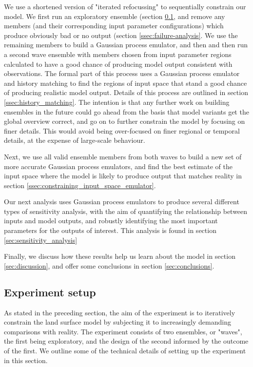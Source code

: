 \documentclass[gmd, manuscript]{copernicus}
\begin{document}
We use a shortened version of "iterated refocussing" to sequentially constrain our model.  We first run an exploratory ensemble (section \ref{ssec:experiment_setup}, and remove any members (and their corresponding input parameter configurations) which produce obviously bad or no output (section \ref{ssec:failure-analysis}. We use the remaining members to build a Gaussian process emulator, and then and then run a second wave ensemble with members chosen from input parameter regions calculated to have a good chance of producing model output consistent with observations. The formal part of this process uses a Gaussian process emulator and history matching to find the regions of input space that stand a good chance of producing realistic model output. Details of this process are outlined in section \ref{ssec:history_matching}. The intention is that any further work on building ensembles in the future could go ahead from the basis that model variants get the global overview correct, and go on to further constrain the model by focusing on finer details. This would avoid being over-focused on finer regional or temporal details, at the expense of large-scale behaviour.

Next, we use all valid ensemble members from both waves to build a new set of more accurate Gaussian process emulators, and find the best estimate of the input space where the model is likely to produce output that matches reality in section \ref{ssec:constraining_input_space_emulator}.

Our next analysis uses Gaussian process emulators to produce several different types of sensitivity analysis, with the aim of quantifying the relationship between inputs and model outputs, and robustly identifying the most important parameters for the outputs of interest. This analysis is found in section \ref{sec:sensitivity_analysis}

Finally, we discuss how these results help us learn about the model in section \ref{sec:discussion}, and offer some conclusions in section \ref{sec:conclusions}.

\subsection {Experiment setup}\label{ssec:experiment_setup}

As stated in the preceding section, the aim of the experiment is to iteratively constrain the land surface model by subjecting it to increasingly demanding comparisons with reality. The experiment consists of two ensembles, or "waves", the first being exploratory, and the design of the second informed by the outcome of the first.  We outline some of the technical details of setting up the experiment in this section.
\end{document}
